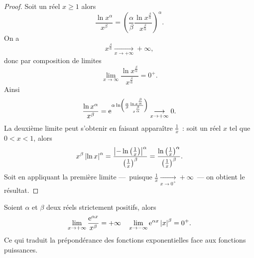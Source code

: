 \begin{proof}
  Soit un réel $x \geq 1$ alors
  \begin{equation}
    \frac{\ln x^\alpha}{x^\beta}=\left(\frac{\alpha}{\beta} \frac{\ln x^{\frac{\beta}{\alpha}}}{x^{\frac{\beta}{\alpha}}} \right)^\alpha.
  \end{equation}
  On a
  \begin{equation}
    x^{\frac{\beta}{\alpha}}\underset{x \to +\infty}{\longrightarrow}+\infty,
  \end{equation}
  donc par composition de limites
  \begin{equation}
    \lim\limits_{x \to \infty} \frac{\ln x^{\frac{\beta}{\alpha}}}{x^{\frac{\beta}{\alpha}}}=0^{+}.
  \end{equation}
  Ainsi
  \begin{equation}
    \frac{\ln x ^\alpha}{x^\beta}=\operatorname{e}^{\alpha \ln \left(\frac{\alpha}{\beta} \frac{\ln x^{\frac{\beta}{\alpha}}}{x^{\frac{\beta}{\alpha}}} \right)} \underset{x \to +\infty}{\longrightarrow}0.
  \end{equation}
  La deuxième limite peut s'obtenir en faisant apparaître $\frac{1}{x}$~: soit un réel $x$ tel que $0<x<1$, alors
  \begin{equation}
    x^\beta \left\lvert\ln x\right\rvert^\alpha=\frac{\left\lvert-\ln\left(\frac{1}{x}\right)\right\rvert^\alpha}{\left(\frac{1}{x} \right)^\beta}=\frac{\ln\left(\frac{1}{x}\right)^\alpha}{\left(\frac{1}{x}\right)^\beta}.
  \end{equation}
  Soit en appliquant la première limite ---~puisque $\frac{1}{x}\underset{x \to 0^+}{\longrightarrow}+\infty$~--- on obtient le résultat.
\end{proof}
%
\begin{prop}
  Soient $\alpha$ et $\beta$ deux réels strictement positifs, alors
  \begin{equation}
    \lim\limits_{x \to + \infty} \frac{\operatorname{e}^{\alpha x}}{x^\beta}=+\infty \quad \lim\limits_{x \to -\infty} \operatorname{e}^{\alpha x} \left\lvert x\right\rvert^\beta=0^+.
  \end{equation}
  Ce qui traduit la prépondérance des fonctions exponentielles face aux fonctions puissances.
\end{prop}
%
